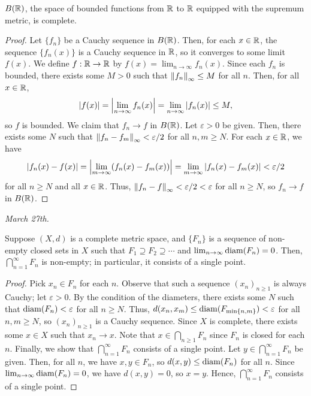 \begin{lemma}
    $B(\mathbb{R})$, the space of bounded functions from $\mathbb{R}$ to $\mathbb{R}$ equipped with the supremum metric, is complete.
\end{lemma}
\begin{proof}
    Let $\{f_{n}\}$ be a Cauchy sequence in $B(\mathbb{R})$. Then, for each $x \in \mathbb{R}$, the sequence $\{f_{n}(x)\}$ is a Cauchy sequence in $\mathbb{R}$, so it converges to some limit $f(x)$. We define $f: \mathbb{R} \to \mathbb{R}$ by $f(x) = \lim_{n \to \infty} f_{n}(x)$. Since each $f_{n}$ is bounded, there exists some $M > 0$ such that $\left\lVert f_{n}\right\rVert_{\infty} \leq M$ for all $n$. Then, for all $x \in \mathbb{R}$,
    \begin{align}
        |f(x)| = \left| \lim_{n \to \infty} f_{n}(x) \right| = \lim_{n \to \infty} |f_{n}(x)| \leq M,
    \end{align}
    so $f$ is bounded. We claim that $f_{n} \to f$ in $B(\mathbb{R})$. Let $\varepsilon > 0$ be given. Then, there exists some $N$ such that $\left\lVert f_{n} - f_{m}\right\rVert_{\infty} < \varepsilon/2$ for all $n,m \geq N$. For each $x \in \mathbb{R}$, we have
    \begin{align}
        |f_{n}(x) - f(x)| = \left| \lim_{m \to \infty} (f_{n}(x) - f_{m}(x)) \right| = \lim_{m \to \infty} |f_{n}(x) - f_{m}(x)| < \varepsilon/2
    \end{align}
    for all $n \geq N$ and all $x \in \mathbb{R}$. Thus, $\left\lVert f_{n} - f\right\rVert_{\infty} < \varepsilon/2 < \varepsilon$ for all $n \geq N$, so $f_{n} \to f$ in $B(\mathbb{R})$.
\end{proof}

\textit{March 27th.}

\begin{proposition}
    Suppose $(X,d)$ is a complete metric space, and $\{F_{n}\}$ is a sequence of non-empty closed sets in $X$ such that $F_{1} \supseteq F_{2} \supseteq \cdots$ and $\lim_{n \to \infty} \operatorname{diam}(F_{n}) = 0$. Then, $\bigcap_{n=1}^{\infty} F_{n}$ is non-empty; in particular, it consists of a single point.
\end{proposition}

\begin{proof}
    Pick $x_{n} \in F_{n}$ for each $n$. Observe that such a sequence $(x_{n})_{n \geq 1}$ is always Cauchy; let $\varepsilon > 0$. By the condition of the diameters, there exists some $N$ such that $\operatorname{diam}(F_{n}) < \varepsilon$ for all $n \geq N$. Thus, $d(x_{n},x_{m}) \leq \operatorname{diam}(F_{\min\{n,m\}}) < \varepsilon$ for all $n,m \geq N$, so $(x_{n})_{n \geq 1}$ is a Cauchy sequence. Since $X$ is complete, there exists some $x \in X$ such that $x_{n} \to x$. Note that $x \in \bigcap_{n \geq 1} F_{n}$ since $F_{n}$ is closed for each $n$. Finally, we show that $\bigcap_{n=1}^{\infty} F_{n}$ consists of a single point. Let $y \in \bigcap_{n=1}^{\infty} F_{n}$ be given. Then, for all $n$, we have $x,y \in F_{n}$, so $d(x,y) \leq \operatorname{diam}(F_{n})$ for all $n$. Since $\lim_{n \to \infty} \operatorname{diam}(F_{n}) = 0$, we have $d(x,y) = 0$, so $x = y$. Hence, $\bigcap_{n=1}^{\infty} F_{n}$ consists of a single point.
\end{proof}

